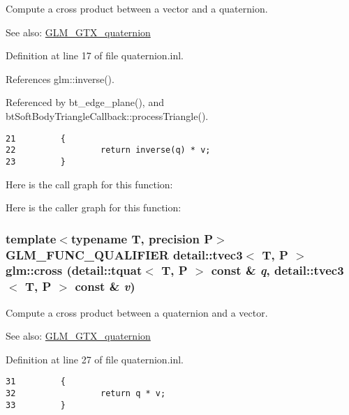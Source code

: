 Compute a cross product between a vector and a quaternion.

\begin{Desc}
\item[See also:]\hyperlink{group__gtx__quaternion}{GLM\_\-GTX\_\-quaternion} \end{Desc}


Definition at line 17 of file quaternion.inl.

References glm::inverse().

Referenced by bt\_\-edge\_\-plane(), and btSoftBodyTriangleCallback::processTriangle().

\begin{Code}\begin{verbatim}21         {
22                 return inverse(q) * v;
23         }
\end{verbatim}
\end{Code}




Here is the call graph for this function:

Here is the caller graph for this function:\hypertarget{group__gtx__quaternion_g968a8e63b616c369286b541a3ac96484}{
\subsubsection[cross]{\setlength{\rightskip}{0pt plus 5cm}template$<$typename T, precision P$>$ GLM\_\-FUNC\_\-QUALIFIER detail::tvec3$<$ T, P $>$ glm::cross (detail::tquat$<$ T, P $>$ const \& {\em q}, \/  detail::tvec3$<$ T, P $>$ const \& {\em v})}}
\label{group__gtx__quaternion_g968a8e63b616c369286b541a3ac96484}


Compute a cross product between a quaternion and a vector.

\begin{Desc}
\item[See also:]\hyperlink{group__gtx__quaternion}{GLM\_\-GTX\_\-quaternion} \end{Desc}


Definition at line 27 of file quaternion.inl.

\begin{Code}\begin{verbatim}31         {
32                 return q * v;
33         }
\end{verbatim}
\end{Code}


